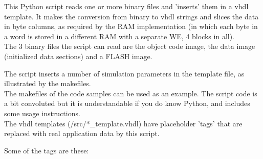    
    \begin{figure*}[ht]
    \begin{center}
    {\small
    }
    \end{center}
    \label{lb}
    \end{figure*}
    
    
    
    This Python script reads one or more binary files and 'inserts' them in a 
    vhdl template. It makes the
    conversion from binary to vhdl strings and slices the data in byte columns,
    as required by the RAM implementation (in which each byte in a word is
    stored in a different RAM with a separate WE, 4 blocks in all).\\
    
    The 3 binary files the script can read are the object code image, the 
    data image (initialized data sections) and a FLASH image.
    
    The script inserts a number of simulation parameters in the template file,
    as illustrated by the makefiles.\\
    
    The makefiles of the code samples can be used as an example. The script code
    is a bit convoluted but it is understandable if you do know Python, 
    and includes some usage instructions.\\

    The vhdl templates (/src/*\_template.vhdl) have placeholder 'tags' that are
    replaced with real application data by this script.

    Some of the tags are these:

